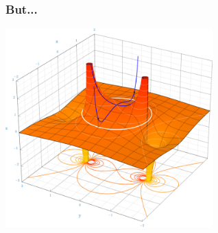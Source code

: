 \documentclass[xcolor=pdftex,dvipsnames,table]{beamer}
\begin{document}
\begin{frame}
\frametitle{But...}
\begin{center}
\includegraphics[width=0.6\textwidth]{TaylorComplexConv}
\end{center}
\end{frame}
\end{document}
